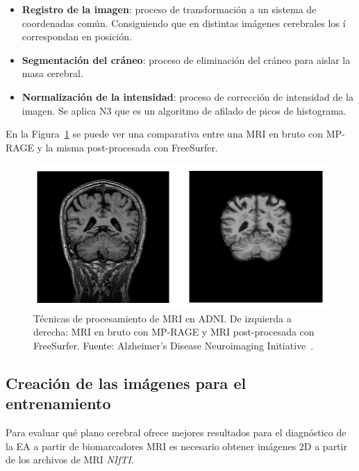 \begin{itemize}
    \item \textbf{Registro de la imagen}: proceso de transformación a un sistema de coordenadas común.
    Consiguiendo que en distintas imágenes cerebrales los í correspondan en posición.
    \item \textbf{Segmentación del cráneo}: proceso de eliminación del cráneo para aislar la masa cerebral.
    \item \textbf{Normalización de la intensidad}: proceso de corrección de intensidad de la imagen.
    Se aplica N3 que es un algoritmo de afilado de picos de histograma. \\
\end{itemize}

En la Figura~\ref{fig:adni-mri} se puede ver una comparativa entre una MRI en bruto con MP-RAGE y la misma post-procesada con
FreeSurfer.

\begin{figure}[H]
    \centering
    \includegraphics[width=\textwidth]{./imgs/adni-mri}
    \caption{Técnicas de procesamiento de MRI en ADNI. De izquierda a derecha: MRI en bruto con MP-RAGE y MRI
    post-procesada con FreeSurfer. Fuente: Alzheimer’s Disease Neuroimaging Initiative~\cite{img-adni-mri}. }
    \label{fig:adni-mri}
\end{figure}

\subsection{Creación de las imágenes para el entrenamiento}\label{subsec:creacion-de-las-imagenes-para-el-entrenamiento}
Para evaluar qué plano cerebral ofrece mejores resultados para el diagnóstico de la EA a partir de biomarcadores MRI es
necesario obtener imágenes 2D a partir de los archivos de MRI \textit{NIfTI}.

